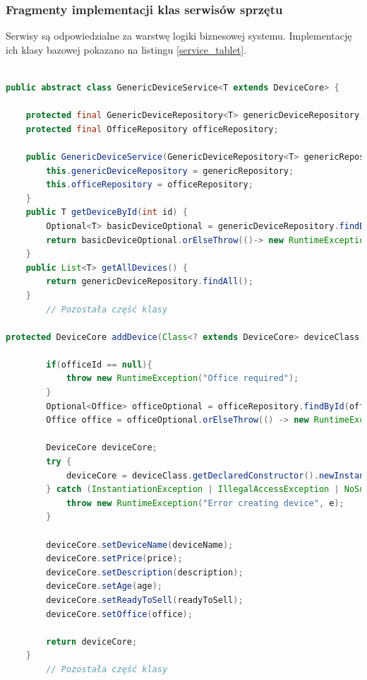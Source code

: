 \subsubsection{Fragmenty implementacji klas serwisów sprzętu}
Serwisy są odpowiedzialne za warstwę logiki biznesowej systemu. Implementację ich klasy bazowej pokazano na listingu \ref{service_tablet}.
\begin{lstlisting}[language=Java, style=JavaStyle,  caption={Klasa nadrzędna serwisu sprzętu GenericDeviceService}, label={service_tablet}]

public abstract class GenericDeviceService<T extends DeviceCore> {

    protected final GenericDeviceRepository<T> genericDeviceRepository;
    protected final OfficeRepository officeRepository;

    public GenericDeviceService(GenericDeviceRepository<T> genericRepository, OfficeRepository officeRepository) {
        this.genericDeviceRepository = genericRepository;
        this.officeRepository = officeRepository;
    }
    public T getDeviceById(int id) {
        Optional<T> basicDeviceOptional = genericDeviceRepository.findById(id);
        return basicDeviceOptional.orElseThrow(()-> new RuntimeException("Device not found with id: " + id));
    }
    public List<T> getAllDevices() {
        return genericDeviceRepository.findAll();
    }
		// Pozostała część klasy

protected DeviceCore addDevice(Class<? extends DeviceCore> deviceClass, String deviceName, Double price, String description, Integer age, Boolean readyToSell, Integer officeId) {

        if(officeId == null){
            throw new RuntimeException("Office required");
        }
        Optional<Office> officeOptional = officeRepository.findById(officeId);
        Office office = officeOptional.orElseThrow(() -> new RuntimeException("Office not found with id: " + officeId));

        DeviceCore deviceCore;
        try {
            deviceCore = deviceClass.getDeclaredConstructor().newInstance();
        } catch (InstantiationException | IllegalAccessException | NoSuchMethodException | InvocationTargetException e) {
            throw new RuntimeException("Error creating device", e);
        }

        deviceCore.setDeviceName(deviceName);
        deviceCore.setPrice(price);
        deviceCore.setDescription(description);
        deviceCore.setAge(age);
        deviceCore.setReadyToSell(readyToSell);
        deviceCore.setOffice(office);

        return deviceCore;
    }
		// Pozostała część klasy
\end{lstlisting}
